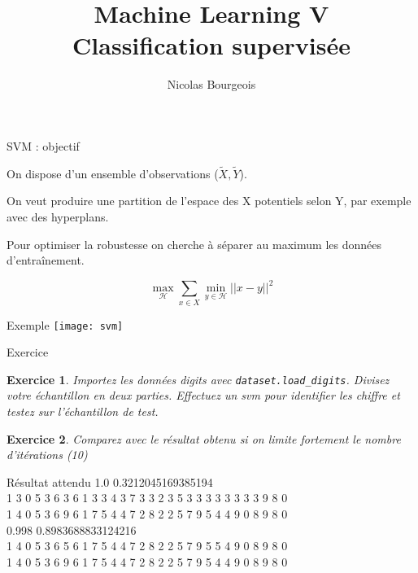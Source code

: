 \documentclass[11pt]{beamer}
\title{Machine Learning V \\ Classification supervisée}
\author{Nicolas Bourgeois}
\date{}
\newtheorem{exercice}{Exercice}
\begin{document}
\begin{frame}
\maketitle
\end{frame}

\begin{frame}{SVM : objectif}

On dispose d'un ensemble d'observations ($\tilde{X},\tilde{Y}$).

\pause
\vspace{0.2cm}

On veut produire une partition de l'espace des X potentiels selon Y, par exemple avec des hyperplans.\\
\pause
\vspace{0.2cm}

Pour optimiser la robustesse on cherche à séparer au maximum les données d'entraînement.

$$\max_{\mathcal{H}}\sum _{x \in X} \min_{y \in \mathcal{H}} ||x-y||^2$$

\end{frame}

\begin{frame}{Exemple}
\texttt{[image: svm]}
\end{frame}


\begin{frame}{Exercice}
\begin{exercice}
Importez les données digits avec \texttt{dataset.load\_digits}. Divisez votre échantillon en deux parties. Effectuez un svm pour identifier les chiffre et testez sur l'échantillon de test.
\end{exercice}
\begin{exercice}
Comparez avec le résultat obtenu si on limite fortement le nombre d'itérations (10)
\end{exercice}
\end{frame}

\begin{frame}{Résultat attendu}
1.0 0.3212045169385194 \\
1 3 0 5 3 6 3 6 1 3 3 4 3 7 3 3 2 3 5 3 3 3 3 3 3 3 3 9 8 0 \\
1 4 0 5 3 6 9 6 1 7 5 4 4 7 2 8 2 2 5 7 9 5 4 4 9 0 8 9 8 0 \\
\vspace{0.2cm}
0.998 0.8983688833124216 \\
1 4 0 5 3 6 5 6 1 7 5 4 4 7 2 8 2 2 5 7 9 5 5 4 9 0 8 9 8 0 \\
1 4 0 5 3 6 9 6 1 7 5 4 4 7 2 8 2 2 5 7 9 5 4 4 9 0 8 9 8 0

\end{frame}
\end{document}
